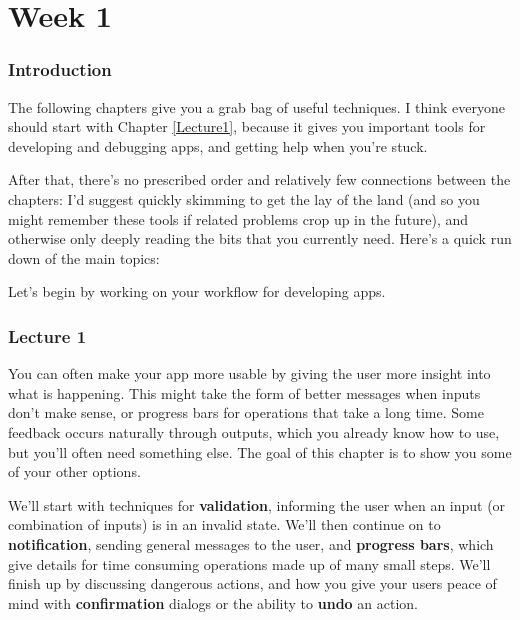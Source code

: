 \documentclass[
]{article}
\begin{document}
\hypertarget{part-week-1}{%
\part*{Week 1}\label{part-week-1}}

\hypertarget{week1-intro}{%
\section*{Introduction}\label{week1-intro}}

The following chapters give you a grab bag of useful techniques.
I think everyone should start with Chapter \ref{Lecture1}, because it gives you important tools for developing and debugging apps, and getting help when you're stuck.

After that, there's no prescribed order and relatively few connections between the chapters: I'd suggest quickly skimming to get the lay of the land (and so you might remember these tools if related problems crop up in the future), and otherwise only deeply reading the bits that you currently need.
Here's a quick run down of the main topics:

Let's begin by working on your workflow for developing apps.

\hypertarget{lecture1}{%
\section{Lecture 1}\label{lecture1}}

You can often make your app more usable by giving the user more insight into what is happening.
This might take the form of better messages when inputs don't make sense, or progress bars for operations that take a long time.
Some feedback occurs naturally through outputs, which you already know how to use, but you'll often need something else.
The goal of this chapter is to show you some of your other options.

We'll start with techniques for \textbf{validation}, informing the user when an input (or combination of inputs) is in an invalid state.
We'll then continue on to \textbf{notification}, sending general messages to the user, and \textbf{progress bars}, which give details for time consuming operations made up of many small steps.
We'll finish up by discussing dangerous actions, and how you give your users peace of mind with \textbf{confirmation} dialogs or the ability to \textbf{undo} an action.
\end{document}
